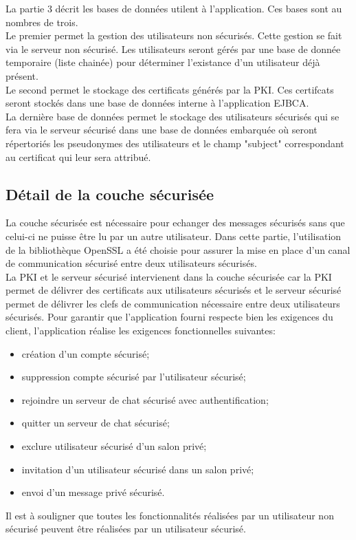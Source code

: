 \documentclass[a4paper,11pt,french]{book}
\begin{document}
La partie 3 décrit les bases de données utilent à l'application. Ces bases sont au nombres de trois.\\
Le premier permet la gestion des utilisateurs non sécurisés. Cette gestion se fait via le serveur non sécurisé. Les utilisateurs seront gérés par une base de donnée temporaire (liste chainée) pour déterminer l'existance d'un utilisateur déjà présent.\\ 
Le second permet le stockage des certificats générés par la PKI. Ces certifcats seront stockés dans une base de données interne à l'application EJBCA.\\ 
La dernière base de données permet le stockage des utilisateurs sécurisés qui se fera via le serveur sécurisé dans une base de données embarquée où seront répertoriés les pseudonymes des utilisateurs et le champ "subject" correspondant au certificat qui leur sera attribué.

\subsection{Détail de la couche sécurisée}
La couche sécurisée est nécessaire pour echanger des messages sécurisés sans que celui-ci ne puisse être lu par un autre utilisateur. Dans cette partie, l'utilisation de la bibliothèque OpenSSL a été choisie pour assurer la mise en place d'un canal de communication sécurisé entre deux utilisateurs sécurisés.\\La PKI et le serveur sécurisé intervienent dans la couche sécurisée car la PKI permet de délivrer des certificats aux utilisateurs sécurisés et le serveur sécurisé permet de délivrer les clefs de communication nécessaire entre deux utilisateurs sécurisés. Pour garantir que l'application fourni respecte bien les exigences du client, l'application réalise les exigences fonctionnelles suivantes:
\begin{itemize}\item création d’un compte sécurisé;\item suppression compte sécurisé par l’utilisateur sécurisé;\item rejoindre un serveur de chat sécurisé avec authentification; \item quitter un serveur de chat sécurisé;\item exclure utilisateur sécurisé d’un salon privé;\item invitation d’un utilisateur sécurisé dans un salon privé;\item envoi d’un message privé sécurisé.\end{itemize}
\vspace{.6cm}
Il est à souligner que toutes les fonctionnalités réalisées par un utilisateur non sécurisé peuvent \^etre réalisées par un utilisateur sécurisé.\\
\end{document}

